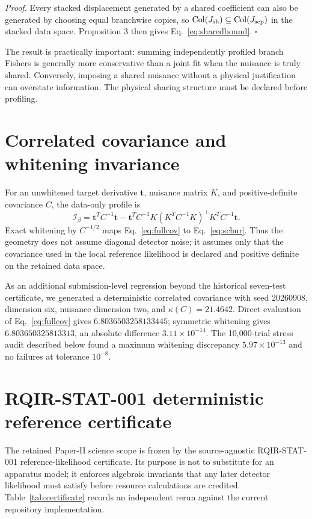\emph{Proof.} Every stacked displacement generated by a shared coefficient can also be generated by choosing equal branchwise copies, so
$\operatorname{Col}(J_{\rm sh})\subseteq\operatorname{Col}(J_{\rm sep})$ in the stacked data space. Proposition 3 then gives Eq.~\eqref{eq:sharedbound}. \hfill$\square$

The result is practically important: summing independently profiled branch Fishers is generally more conservative than a joint fit when the nuisance is truly shared. Conversely, imposing a shared nuisance without a physical justification can overstate information. The physical sharing structure must be declared before profiling.

\section{Correlated covariance and whitening invariance}
\label{sec:covariance}

For an unwhitened target derivative $\bm t$, nuisance matrix $K$, and positive-definite covariance $C$, the data-only profile is
\begin{equation}
 \mathcal I_\beta=
 \bm t^T C^{-1}\bm t
 -\bm t^T C^{-1}K
 (K^TC^{-1}K)^+
 K^TC^{-1}\bm t.
\label{eq:fullcov}
\end{equation}
Exact whitening by $C^{-1/2}$ maps Eq.~\eqref{eq:fullcov} to Eq.~\eqref{eq:schur}. Thus the geometry does not assume diagonal detector noise; it assumes only that the covariance used in the local reference likelihood is declared and positive definite on the retained data space.

As an additional submission-level regression beyond the historical seven-test certificate, we generated a deterministic correlated covariance with seed 20260908, dimension six, nuisance dimension two, and $\kappa(C)=21.4642$. Direct evaluation of Eq.~\eqref{eq:fullcov} gives $6.8036503258133445$; symmetric whitening gives $6.803650325813313$, an absolute difference $3.11\times10^{-14}$. The 10,000-trial stress audit described below found a maximum whitening discrepancy $5.97\times10^{-13}$ and no failures at tolerance $10^{-8}$.

\section{RQIR-STAT-001 deterministic reference certificate}
\label{sec:certificate}

The retained Paper-II science scope is frozen by the source-agnostic RQIR-STAT-001 reference-likelihood certificate. Its purpose is not to substitute for an apparatus model; it enforces algebraic invariants that any later detector likelihood must satisfy before resource calculations are credited. Table~\ref{tab:certificate} records an independent rerun against the current repository implementation.

